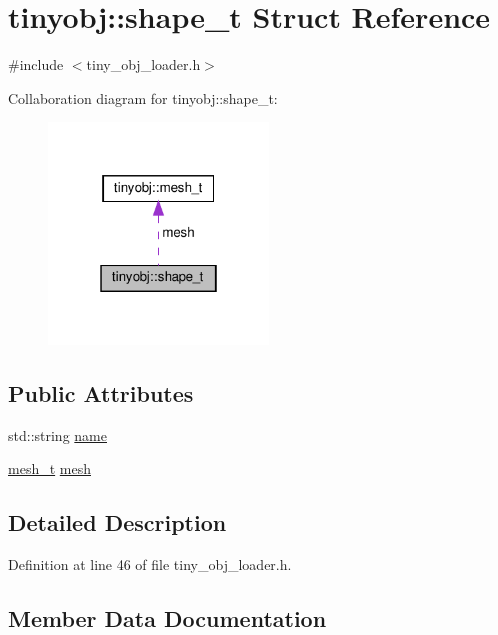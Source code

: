 \hypertarget{structtinyobj_1_1shape__t}{}\section{tinyobj\+:\+:shape\+\_\+t Struct Reference}
\label{structtinyobj_1_1shape__t}


{\ttfamily \#include $<$tiny\+\_\+obj\+\_\+loader.\+h$>$}



Collaboration diagram for tinyobj\+:\+:shape\+\_\+t\+:\nopagebreak
\begin{figure}[H]
\begin{center}
\leavevmode
\includegraphics[width=166pt]{structtinyobj_1_1shape__t__coll__graph}
\end{center}
\end{figure}
\subsection*{Public Attributes}
\begin{DoxyCompactItemize}
\item 
std\+::string \hyperlink{structtinyobj_1_1shape__t_a98650e2e66d00934f68de88eafb34630}{name}
\item 
\hyperlink{structtinyobj_1_1mesh__t}{mesh\+\_\+t} \hyperlink{structtinyobj_1_1shape__t_a3dacb06dfbfe9e245ff4bc7b5b3d9818}{mesh}
\end{DoxyCompactItemize}


\subsection{Detailed Description}


Definition at line 46 of file tiny\+\_\+obj\+\_\+loader.\+h.



\subsection{Member Data Documentation}
\mbox{\label{structtinyobj_1_1shape__t_a3dacb06dfbfe9e245ff4bc7b5b3d9818}} 
